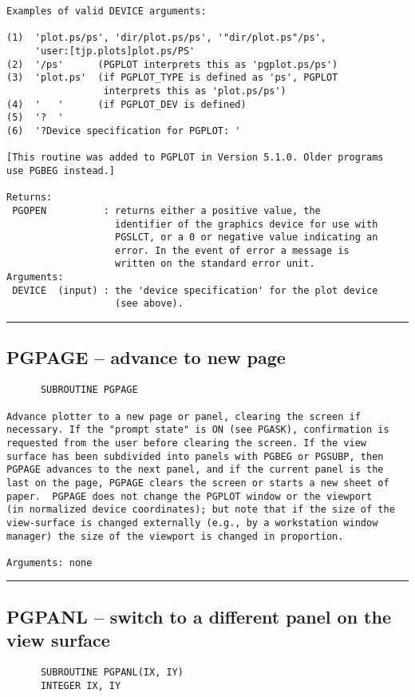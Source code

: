 {\begin{verbatim}
Examples of valid DEVICE arguments:

(1)  'plot.ps/ps', 'dir/plot.ps/ps', '"dir/plot.ps"/ps', 
     'user:[tjp.plots]plot.ps/PS'
(2)  '/ps'      (PGPLOT interprets this as 'pgplot.ps/ps')
(3)  'plot.ps'  (if PGPLOT_TYPE is defined as 'ps', PGPLOT
                 interprets this as 'plot.ps/ps')
(4)  '   '      (if PGPLOT_DEV is defined)
(5)  '?  '
(6)  '?Device specification for PGPLOT: '

[This routine was added to PGPLOT in Version 5.1.0. Older programs
use PGBEG instead.]

Returns:
 PGOPEN          : returns either a positive value, the
                   identifier of the graphics device for use with
                   PGSLCT, or a 0 or negative value indicating an
                   error. In the event of error a message is
                   written on the standard error unit.
Arguments:
 DEVICE  (input) : the 'device specification' for the plot device
                   (see above).
\end{verbatim}
\hrule


\subsection*{PGPAGE -- advance to new page }
\begin{verbatim}
      SUBROUTINE PGPAGE

Advance plotter to a new page or panel, clearing the screen if
necessary. If the "prompt state" is ON (see PGASK), confirmation is
requested from the user before clearing the screen. If the view
surface has been subdivided into panels with PGBEG or PGSUBP, then
PGPAGE advances to the next panel, and if the current panel is the
last on the page, PGPAGE clears the screen or starts a new sheet of
paper.  PGPAGE does not change the PGPLOT window or the viewport
(in normalized device coordinates); but note that if the size of the
view-surface is changed externally (e.g., by a workstation window
manager) the size of the viewport is changed in proportion.

Arguments: none
\end{verbatim}
\hrule


\subsection*{PGPANL -- switch to a different panel on the view surface }
\begin{verbatim}
      SUBROUTINE PGPANL(IX, IY)
      INTEGER IX, IY


\end{verbatim}}
